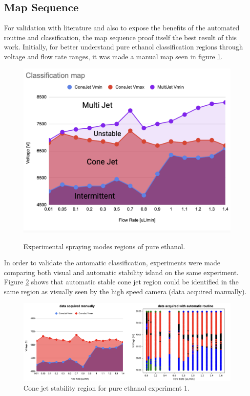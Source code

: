 \subsection{Map Sequence}
\label{subsec:map_results}

For validation with literature and also to expose the benefits of the automated routine and classification, the map sequence proof itself the best result of this work. 
Initially, for better understand pure ethanol classification regions through voltage and flow rate ranges, it was made a manual map seen in figure \ref{fig:stability_1}.

    \begin{figure}[H]
        \center
        \includegraphics[width=12cm]{Figuras/regions.png}
        \label{fig:stability_1}
        \caption{Experimental spraying modes regions of pure ethanol.}
    \end{figure}


    In order to validate the automatic classification, experiments were made comparing both visual and automatic stability island on the same experiment.
    Figure \ref{fig:stability_2} shows that automatic stable cone jet region could be identified in the same region as visually seen by the high speed camera (data acquired manually).

        \begin{figure}[H]
            \center
            \includegraphics[width=16cm]{Figuras/april/manual_stability_island.png}
            \caption{Cone jet stability region for pure ethanol experiment 1.}
            \label{fig:stability_2}
        \end{figure}



